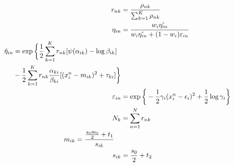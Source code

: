 \documentclass[letterpaper]{article}
\begin{document}

\begin{align}
    \label{rnk}
    r_{nk} &= \frac{\rho_{nk}}{\sum_{k=1}^{K}\rho_{nk}} \\
    \label{eta} 
    \eta_{in}&= \frac{w_i \hat{\eta_{in}}}{w_i\hat{\eta_{in}} + (1 - w_i)\varepsilon_{in}}\\
    \label{etain12} 
    \begin{split}
        \hat{\eta}_{in} &= \exp\bigg\{ \frac{1}{2} \sum_{k=1}^K r_{nk}[\psi(\alpha_{ik}) - \log \beta_{ik}]\\
        &-\frac{1}{2}\sum_{k=1}^{K}r_{nk} \frac{\alpha_{ki}}{\beta_{ki}}[(x_i^n - m_{ik})^2 + \tau_{ki}]\bigg\}
    \end{split}\\
     \label{epsilon}
    \varepsilon_{in} &= \exp{\bigg\{ -\frac{1}{2}\gamma_i (x_i^n - \epsilon_i)^2 + \frac{1}{2}\log\gamma_i\bigg\}}\\
    \label{Nk}
    N_k &= \sum_{\mathclap{n=1}}^{N}r_{nk}\\
    \label{mk}
    \begin{split}
        m_{ik} &= \frac{\frac{s_0m_0}{2} + t_1}
        {s_{ik}}
    \end{split}
    \\
    \label{sk}
    s_{ik} &= \frac{s_0}{2} + t_2
\end{align}
\end{document}
